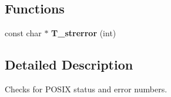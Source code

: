 \subsection*{Functions}
\begin{DoxyCompactItemize}
\item 
\mbox{\label{group__RTEMSTestFrameworkChecksPSX_ga2e6cad8e80a018b5f21dd054d025f810}} 
const char $\ast$ {\bfseries T\+\_\+strerror} (int)
\end{DoxyCompactItemize}


\subsection{Detailed Description}
Checks for P\+O\+S\+IX status and error numbers. 

